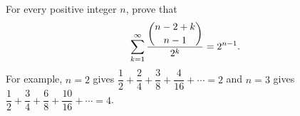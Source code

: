 For every positive integer $n$, prove that
\[\sum_{k=1}^{\infty}\dfrac{\dbinom{n-2+k}{n-1}}{2^k}=2^{n-1}.\]
For example, $n=2$ gives $\dfrac12+\dfrac24+\dfrac38+\dfrac{4}{16}+\cdots=2$ and $n=3$ gives $\dfrac12+\dfrac34+\dfrac68+\dfrac{10}{16}+\cdots=4$.
